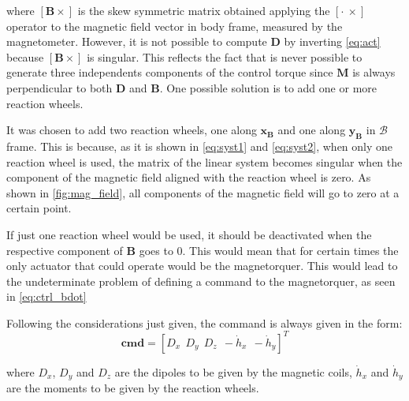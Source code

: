 where $[\boldsymbol{B} \times]$ is the skew symmetric matrix obtained applying the $[\cdot \ \times] $ operator to the magnetic field vector in body frame, measured by the magnetometer.
However, it is not possible to compute $\boldsymbol{D}$ by inverting \autoref{eq:act} because $[\boldsymbol{B} \times]$ is singular. This reflects the fact that is never possible to generate three independents components of the control torque since $\boldsymbol{M}$ is always perpendicular to both $\boldsymbol{D}$ and $\boldsymbol{B}$. One possible solution is to add one or more reaction wheels.

It was chosen to add two reaction wheels, one along $\boldsymbol{x_B}$ and one along $\boldsymbol{y_B}$ in $\mathcal{B}$ frame. This is because, as it is shown in \autoref{eq:syst1} and \autoref{eq:syst2}, when only one reaction wheel is used, the matrix of the linear system becomes singular when the component of the magnetic field aligned with the reaction wheel is zero. As shown in \autoref{fig:mag_field}, all components of the magnetic field will go to zero at a certain point.

If just one reaction wheel would be used, it should be deactivated when the respective component of $\boldsymbol{B}$ goes to 0. This would mean that for certain times the only actuator that could operate would be the magnetorquer. This would lead 
to the undeterminate problem of defining a command to the magnetorquer, as seen in \autoref{eq:ctrl_bdot}

Following the considerations just given, the command is always given in the form:
\begin{equation}
    \label{eq:cmd}
    \boldsymbol{cmd} = [D_x \ \ D_y \ \ D_z \ \ -\Dot{h}_x \ \ -\Dot{h}_y]^T
\end{equation}

where $D_x$, $D_y$ and $D_z$ are the dipoles to be given by the magnetic coils, $\Dot{h}_x$ and $\Dot{h}_y$ are the moments to be given by the reaction wheels.


